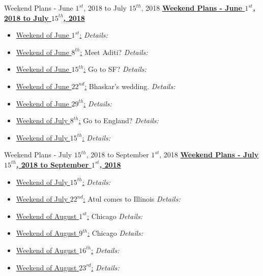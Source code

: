 \ifdefined\POSTER
\begin{block}{Weekend Plans - June $1^{st}$, 2018 to July $15^{th}$, 2018} 
\else
{\underline{\bf Weekend Plans - June $1^{st}$, 2018 to July $15^{th}$, 2018}}\\ 
\fi
\begin{itemize}
\tiny \item \tiny \underline{Weekend of June $1^{st}$:}     {\it Details:}
\item \tiny \underline{Weekend of June  $8^{th}$:} Meet Aditi? {\it Details:}
\item \tiny \underline{Weekend of June $15^{th}$:} Go to SF?  {\it Details:} 
\item \tiny \underline{Weekend of June $22^{nd}$:} Bhaskar's wedding.  {\it Details:} 
\item \tiny \underline{Weekend of June $29^{th}$:} {\it Details:} 
\item \tiny \underline{Weekend of July $8^{th}$:}  Go to
England? \textit{Details:}

\item \tiny \underline{Weekend of July $15^{th}$:}  \textit{Details:}
\end{itemize}

\ifdefined\POSTER
\end{block}
\fi

\ifdefined\POSTER
\begin{block}{Weekend Plans - July $15^{th}$, 2018 to September $1^{st}$, 2018} 
\else
{\underline{\bf Weekend Plans - July $15^{th}$, 2018 to September $1^{st}$, 2018}}\\ 
\fi 

\begin{itemize}
\tiny \item \tiny \underline{Weekend of July $15^{th}$:}     {\it Details:}
\item \tiny \underline{Weekend of July $22^{nd}$:}  Atul comes to Illinois {\it Details:}
\item \tiny \underline{Weekend of August $1^{st}$:} Chicago {\it Details:} 
\item \tiny \underline{Weekend of August $9^{th}$:} Chicago {\it Details:} 
\item \tiny \underline{Weekend of August $16^{th}$:} \textit{Details:}

\item \tiny \underline{Weekend of August $23^{rd}$:}  \textit{Details:}

\end{itemize}

\ifdefined\POSTER
\end{block}
\fi
